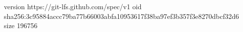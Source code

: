 version https://git-lfs.github.com/spec/v1
oid sha256:3c95884accc79ba77b66003abfa10953617f38ba97ef3b357f3e8270dbcf32d6
size 196756
